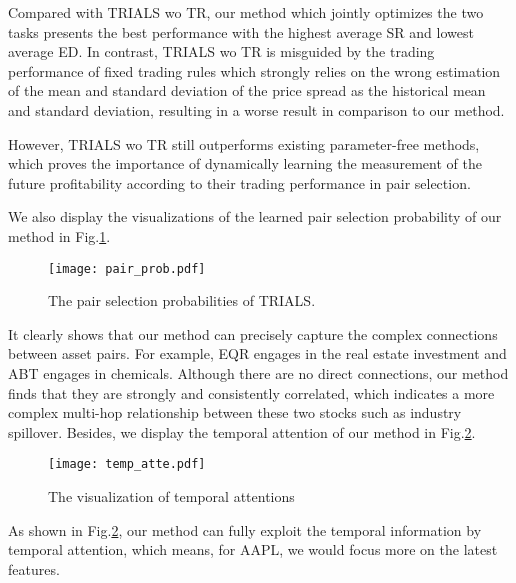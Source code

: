 \documentclass[sigconf]{acmart}
\begin{document}
Compared with TRIALS wo TR, our method which jointly optimizes the two tasks presents the best performance with the highest average SR and lowest average ED.
In contrast, TRIALS wo TR is misguided by the trading performance of fixed trading rules which strongly relies on the wrong estimation of the mean and standard deviation of the price spread as the historical mean and standard deviation, resulting in a worse result in comparison to our method.

However, TRIALS wo TR still outperforms existing parameter-free methods, which proves the importance of dynamically learning the measurement of the future profitability according to their trading performance in pair selection.

We also display the visualizations of the learned pair selection probability of our method in Fig.\ref{fig:pair-prob}.
\begin{figure}[ht]
    \centering
    \texttt{[image: pair\_prob.pdf]}
    \caption{The pair selection probabilities of TRIALS.}
    \label{fig:pair-prob}
\end{figure}
It clearly shows that our method can precisely capture the complex connections between asset pairs.
For example, EQR engages in the real estate investment and ABT engages in chemicals.
Although there are no direct connections, our method finds that they are strongly and consistently correlated, which indicates a more complex multi-hop relationship between these two stocks such as industry spillover.
Besides, we display the temporal attention of 
our method in Fig.\ref{fig:attentions}.
\begin{figure}[ht]
\centering
\texttt{[image: temp\_atte.pdf]}
\caption{The visualization of temporal attentions}
\label{fig:attentions}
\end{figure}
As shown in Fig.\ref{fig:attentions}, our method can fully exploit the temporal information by temporal attention, which means, for AAPL, we would focus more on the latest features.
\end{document}
